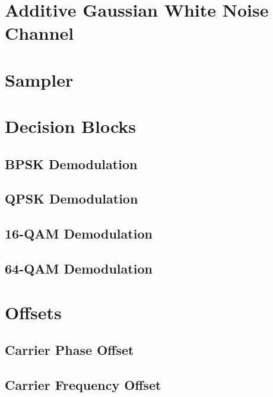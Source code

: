\documentclass[]{article}
\begin{document}
\section{Additive Gaussian White Noise Channel}
\label{app:awgn_channel}


\newpage
\section{Sampler}
\label{app:sampler}



\section{Decision Blocks}
\label{app:dblocks}
\subsection{BPSK Demodulation}
\label{app:bpsk_demod}


\newpage
\subsection{QPSK Demodulation}
\label{app:qpsk_demod}


\subsection{16-QAM Demodulation}
\label{app:qam_16_demod}


\newpage
\subsection{64-QAM Demodulation}
\label{app:qam_64_demod}


\newpage
\section{Offsets}
\label{app:offsets}
\subsection{Carrier Phase Offset}
\label{app:phase_offset}


\newpage
\subsection{Carrier Frequency Offset}
\label{app:freq_offset}

\end{document}
